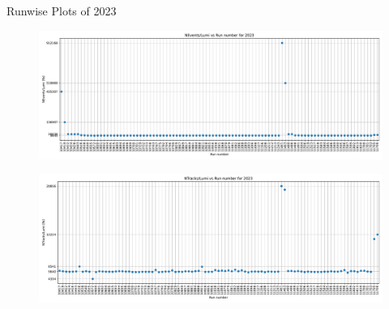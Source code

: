 \begin{frame}{Runwise Plots of 2023}
    \begin{figure}
        \centering
        \includegraphics[width=1.0\textwidth]{plots_runwise/NEventsbyLumi_2023.pdf}
    \end{figure}
    \vspace{-0.35cm}
    \begin{figure}
        \centering
        \includegraphics[width=1.0\textwidth]{plots_runwise/NTracksbyLumi_2023.pdf}
    \end{figure}
\end{frame}



